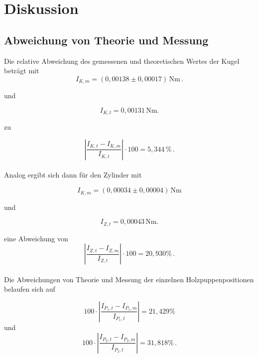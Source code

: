 \section{Diskussion}
\label{sec:Diskussion}

\subsection{Abweichung von Theorie und Messung}

Die relative Abweichung des gemessenen und theoretischen Wertes der Kugel beträgt mit 
\begin{equation*}
    I_{K,m} = (0,00138 \pm 0,00017)\, \unit{\newton\meter}  \, .
\end{equation*}

und

\begin{equation*}
    I_{K,t} = 0,00131 \, \unit{\newton\meter}. %
\end{equation*}

zu

\begin{equation*}
    \left|\frac{I_{K,t} - I_{K,m}}{I_{K,t}} \right| \cdot 100 = 5,344 \,\% \,. %
\end{equation*} \\

Analog ergibt sich dann für den Zylinder mit

\begin{equation*}
    I_{K,m} = (0,00034 \pm 0,00004) \, \unit{\newton\meter}
\end{equation*} 

und

\begin{equation*}
    I_{Z,t} = 0,00043 \,  \unit{\newton\meter}.
\end{equation*}

eine Abweichung von
\begin{equation*}
    \left|\frac{I_{Z,t} - I_{Z,m}}{I_{Z,t}} \right| \cdot 100 = 20,930 \% \,.
\end{equation*} \\

Die Abweichungen von Theorie und Messung der einzelnen Holzpuppenpositionen belaufen sich auf

\begin{equation*}
  100 \cdot \left|\frac{I_{P_1,t} - I_{P_1,m}}{I_{P_1,t}} \right| = 21,429 \%
\end{equation*}
und
\begin{equation*}
  100 \cdot \left|\frac{I_{P_2,t} - I_{P_2,m}}{I_{P_2,t}} \right| = 31,818 \% \,.
\end{equation*} \\

